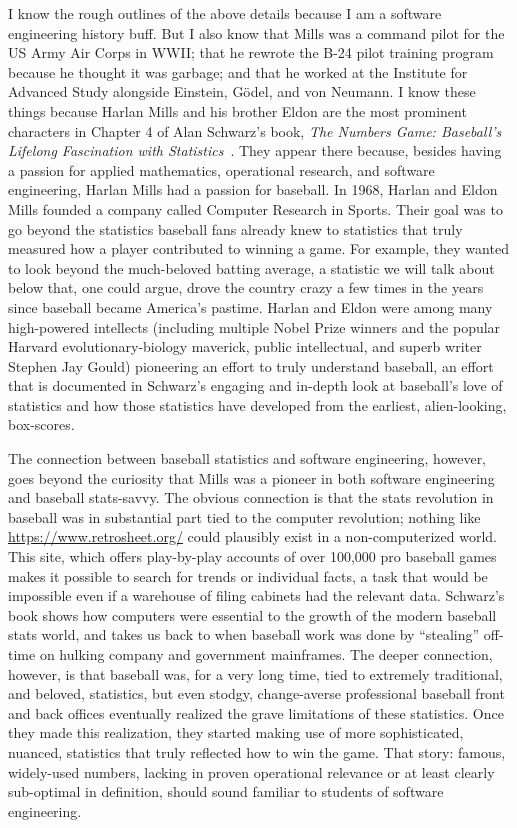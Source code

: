 \documentclass[sigplan,screen]{acmart}
\begin{document}
I know the rough outlines of the above details because I am a software
engineering history buff.  But I also know that Mills was a command pilot for
the US Army Air Corps in WWII; that he rewrote the B-24 pilot training
program because he thought it was garbage; and that he worked at the
Institute for Advanced Study alongside Einstein, G\"odel, and von
Neumann. I know these things because Harlan Mills and his brother Eldon are the most
prominent characters in Chapter 4 of Alan Schwarz's book, \emph{The
  Numbers Game: Baseball's Lifelong Fascination with Statistics}~\cite{schwarz2004numbers}.
They appear there because, besides having a passion for applied mathematics,
operational research, and software engineering, Harlan Mills had a
passion for baseball.  In 1968, Harlan and Eldon Mills founded a
company called Computer Research in Sports.  Their goal was to go
beyond the statistics baseball
fans already knew to statistics that truly measured how a player
contributed to winning a game. For example, they wanted to look beyond
the much-beloved batting average, a statistic we will talk about
below that, one could argue, drove the country crazy a few times in the
years since baseball became America’s pastime.
Harlan and Eldon were among many high-powered
intellects (including multiple Nobel Prize winners and the popular
Harvard evolutionary-biology maverick, public intellectual, and superb
writer Stephen Jay Gould) pioneering an effort to truly understand
baseball, an effort that is documented in Schwarz’s engaging and in-depth look at
baseball’s love of statistics and how those statistics have developed
from the earliest, alien-looking, box-scores.

The connection between baseball statistics and software engineering,
however, goes beyond the curiosity that Mills was a pioneer in both
software engineering and baseball stats-savvy.  The obvious connection
is that the stats revolution in baseball was in substantial part tied
to the computer revolution; nothing like \url{https://www.retrosheet.org/}
could plausibly exist in a non-computerized world. This site,
which offers play-by-play accounts of over 100,000 pro baseball games
makes it possible to search for trends or individual facts, a task that
would be impossible even if a warehouse of filing cabinets had the
relevant data. Schwarz's book shows how computers were essential to
the growth of the modern baseball stats world, and takes us back to
when baseball work was done by “stealing” off-time on hulking company
and government mainframes. The deeper connection, however, is that baseball
was, for a very long time, tied to extremely traditional, and beloved,
statistics, but even stodgy, change-averse professional baseball front
and back offices eventually realized the grave limitations of these
statistics. Once they made this realization, they started making use of more sophisticated, nuanced, statistics
that truly reflected how to win the game.  That story:  famous,
widely-used numbers, lacking in proven operational relevance or at
least clearly sub-optimal in definition, should
sound familiar to students of software engineering.
\end{document}
